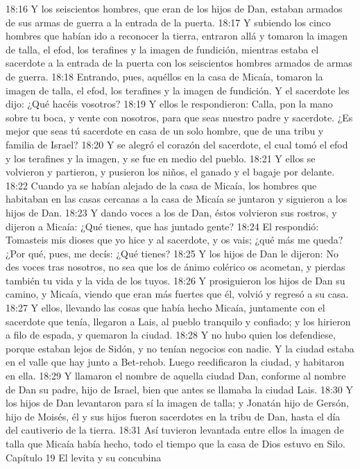18:16 Y los seiscientos hombres, que eran de los hijos de Dan, estaban armados de sus armas de guerra a la entrada de la puerta.  
18:17 Y subiendo los cinco hombres que habían ido a reconocer la tierra, entraron allá y tomaron la imagen de talla, el efod, los terafines y la imagen de fundición, mientras estaba el sacerdote a la entrada de la puerta con los seiscientos hombres armados de armas de guerra.  
18:18 Entrando, pues, aquéllos en la casa de Micaía, tomaron la imagen de talla, el efod, los terafines y la imagen de fundición. Y el sacerdote les dijo: ¿Qué hacéis vosotros?  
18:19 Y ellos le respondieron: Calla, pon la mano sobre tu boca, y vente con nosotros, para que seas nuestro padre y sacerdote. ¿Es mejor que seas tú sacerdote en casa de un solo hombre, que de una tribu y familia de Israel?  
18:20 Y se alegró el corazón del sacerdote, el cual tomó el efod y los terafines y la imagen, y se fue en medio del pueblo.  
18:21 Y ellos se volvieron y partieron, y pusieron los niños, el ganado y el bagaje por delante.  
18:22 Cuando ya se habían alejado de la casa de Micaía, los hombres que habitaban en las casas cercanas a la casa de Micaía se juntaron y siguieron a los hijos de Dan.  
18:23 Y dando voces a los de Dan, éstos volvieron sus rostros, y dijeron a Micaía: ¿Qué tienes, que has juntado gente?  
18:24 El respondió: Tomasteis mis dioses que yo hice y al sacerdote, y os vais; ¿qué más me queda? ¿Por qué, pues, me decís: ¿Qué tienes?  
18:25 Y los hijos de Dan le dijeron: No des voces tras nosotros, no sea que los de ánimo colérico os acometan, y pierdas también tu vida y la vida de los tuyos.  
18:26 Y prosiguieron los hijos de Dan su camino, y Micaía, viendo que eran más fuertes que él, volvió y regresó a su casa.  
18:27 Y ellos, llevando las cosas que había hecho Micaía, juntamente con el sacerdote que tenía, llegaron a Lais, al pueblo tranquilo y confiado; y los hirieron a filo de espada, y quemaron la ciudad.  
18:28 Y no hubo quien los defendiese, porque estaban lejos de Sidón, y no tenían negocios con nadie. Y la ciudad estaba en el valle que hay junto a Bet-rehob. Luego reedificaron la ciudad, y habitaron en ella.  
18:29 Y llamaron el nombre de aquella ciudad Dan, conforme al nombre de Dan su padre, hijo de Israel, bien que antes se llamaba la ciudad Lais.  
18:30 Y los hijos de Dan levantaron para sí la imagen de talla; y Jonatán hijo de Gersón, hijo de Moisés, él y sus hijos fueron sacerdotes en la tribu de Dan, hasta el día del cautiverio de la tierra.  
18:31 Así tuvieron levantada entre ellos la imagen de talla que Micaía había hecho, todo el tiempo que la casa de Dios estuvo en Silo.  
Capítulo 19
El levita y su concubina  

